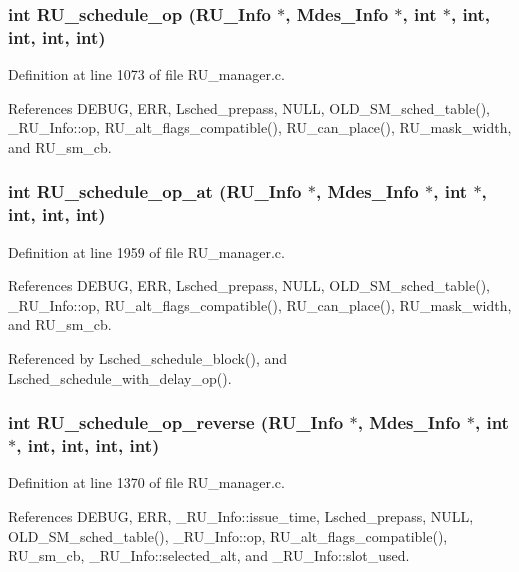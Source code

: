 \subsubsection{\setlength{\rightskip}{0pt plus 5cm}int RU\_\-schedule\_\-op (\bf{RU\_\-Info} $\ast$, Mdes\_\-Info $\ast$, int $\ast$, int, int, int, int)}\label{RU__manager_8h_ad3ff2c23e590a0892548b0ba3975365}




Definition at line 1073 of file RU\_\-manager.c.

References DEBUG, ERR, Lsched\_\-prepass, NULL, OLD\_\-SM\_\-sched\_\-table(), \_\-RU\_\-Info::op, RU\_\-alt\_\-flags\_\-compatible(), RU\_\-can\_\-place(), RU\_\-mask\_\-width, and RU\_\-sm\_\-cb.
\subsubsection{\setlength{\rightskip}{0pt plus 5cm}int RU\_\-schedule\_\-op\_\-at (\bf{RU\_\-Info} $\ast$, Mdes\_\-Info $\ast$, int $\ast$, int, int, int)}\label{RU__manager_8h_0ca2a20b06bb4d5c52bcd36ecca6336b}




Definition at line 1959 of file RU\_\-manager.c.

References DEBUG, ERR, Lsched\_\-prepass, NULL, OLD\_\-SM\_\-sched\_\-table(), \_\-RU\_\-Info::op, RU\_\-alt\_\-flags\_\-compatible(), RU\_\-can\_\-place(), RU\_\-mask\_\-width, and RU\_\-sm\_\-cb.

Referenced by Lsched\_\-schedule\_\-block(), and Lsched\_\-schedule\_\-with\_\-delay\_\-op().
\subsubsection{\setlength{\rightskip}{0pt plus 5cm}int RU\_\-schedule\_\-op\_\-reverse (\bf{RU\_\-Info} $\ast$, Mdes\_\-Info $\ast$, int $\ast$, int, int, int, int)}\label{RU__manager_8h_3d57bf9df20e52ded3641f0a91b51f6d}




Definition at line 1370 of file RU\_\-manager.c.

References DEBUG, ERR, \_\-RU\_\-Info::issue\_\-time, Lsched\_\-prepass, NULL, OLD\_\-SM\_\-sched\_\-table(), \_\-RU\_\-Info::op, RU\_\-alt\_\-flags\_\-compatible(), RU\_\-sm\_\-cb, \_\-RU\_\-Info::selected\_\-alt, and \_\-RU\_\-Info::slot\_\-used.
